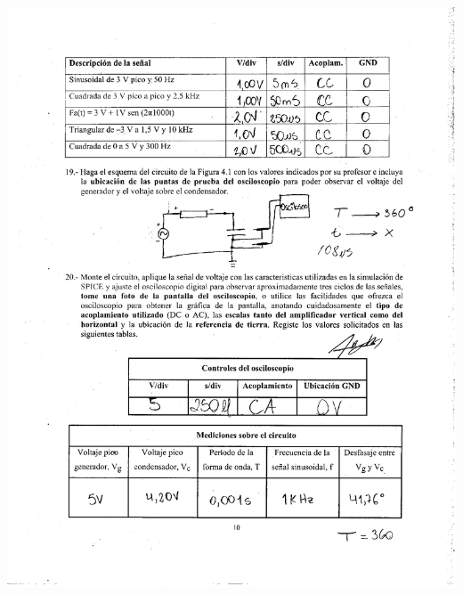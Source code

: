 \documentclass[12pt]{article}
\begin{document}
	\begin{center}
		\includegraphics[width=16cm,height=20cm]{Img/anex_lab_4_0006}
	\end{center}
	
\end{document}
